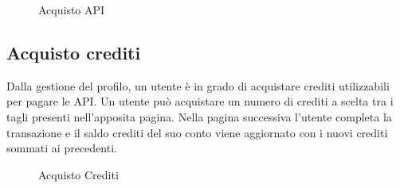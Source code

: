 \label{Acquisto API}
\begin{figure}[H]
	\centering
	\caption{Acquisto API}
\end{figure}

\subsection{Acquisto crediti}
Dalla gestione del profilo, un utente è in grado di acquistare crediti utilizzabili per pagare le API. Un utente può acquistare un numero di crediti a scelta tra i tagli presenti nell'apposita pagina. Nella pagina successiva l'utente completa la transazione e il saldo crediti del suo conto viene aggiornato con i nuovi crediti sommati ai precedenti.

\label{Acquisto Crediti}
\begin{figure}[H]
	\centering
	\caption{Acquisto Crediti}
\end{figure}

